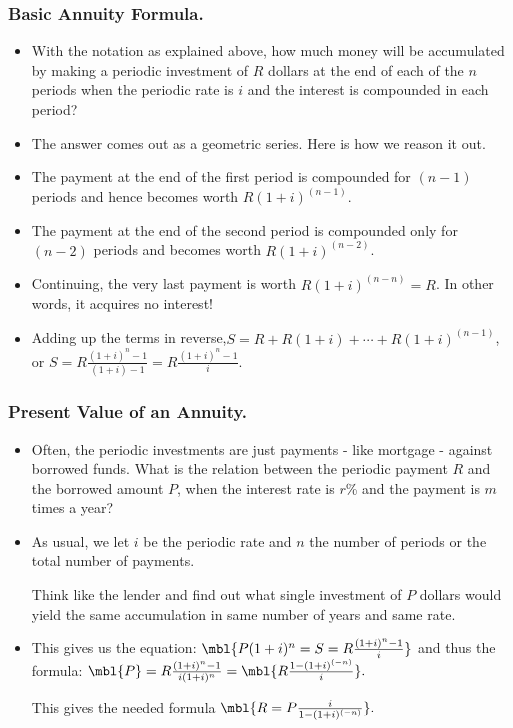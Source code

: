 \begin{frame}%
  \frametitle{Basic Annuity Formula.}
  \begin{itemize}%

\item With the notation as explained above, how much money will be
accumulated by making a periodic investment of $R$ dollars at the end of
each of the  $n$ periods when the periodic rate is $i$ and the interest
is compounded in each period?

\item The answer comes out as a geometric series.
Here is how we reason it out.
\item The payment at the end of the first period is compounded for
$(n-1)$ periods and hence becomes worth $R(1+i)^{(n-1)}$.

\item The payment at the end of the second period is compounded only for
$(n-2)$ periods and becomes worth $R(1+i)^{(n-2)}$.
\item Continuing, the very last payment is worth $R(1+i)^{(n-n)} = R$.
In other words, it acquires no interest!
\item Adding up the terms in reverse,$S=R + R(1+i) + \cdots +
R(1+i)^{(n-1)}$, or $S= R \frac{(1+i)^n -1}{(1+i)-1}
= R \frac{(1+i)^n -1}{i}.$


\end{itemize}
\end{frame}

%

\begin{frame}%
  \frametitle{Present Value of an Annuity.}
  \begin{itemize}%
 

\item
Often, the periodic investments are just payments - like mortgage -
against borrowed funds. What is the relation between the periodic
payment $R$ and the borrowed amount $P$, when the interest rate is $r$\%
and the payment is $m$ times a year?

\item

As usual, we let $i$ be the periodic rate and $n$ the number of periods
or the total number of payments.

Think like the lender and find out what single investment  of $P$ dollars
would yield the same accumulation in same number of years and same rate.
\item This gives us the equation:
$\mbl{P(1+i)^n =S =  R \frac{(1+i)^n -1}{i}}$
and thus the formula:
$\mbl{P} = R \frac{(1+i)^n -1}{i (1+i)^n} = \mbl{R\frac{1-(1+i)^{(-n)}}{i}}.$

This gives the needed formula
$\mbl{R = P\frac{i}{1-(1+i)^{(-n)}}} .$


\end{itemize}
\end{frame}

